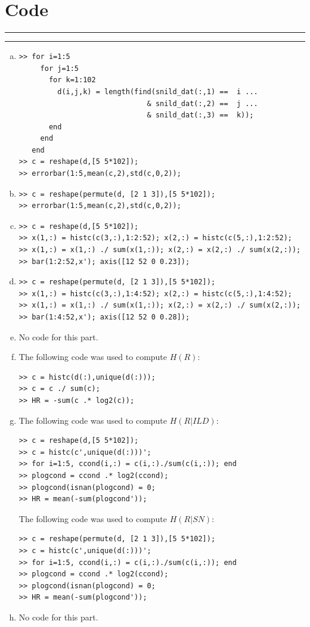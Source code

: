 \documentclass[11pt]{article}
\newcounter{questionCounter}
\newcounter{partCounter}[questionCounter]
\newenvironment{question}[2][\arabic{questionCounter}]{%
    \setcounter{partCounter}{0}%
    \vspace{.25in} \hrule \vspace{0.5em}%
        \noindent{\bf #2}%
    \vspace{0.8em} \hrule \vspace{.10in}%
    \addtocounter{questionCounter}{1}%
}{}
\begin{document}
\newpage
\section*{Code}

\begin{question}{Problem 1}
\begin{enumerate}[a.]
\item
\begin{verbatim}
>> for i=1:5
     for j=1:5
       for k=1:102
         d(i,j,k) = length(find(snild_dat(:,1) ==  i ...
                              & snild_dat(:,2) ==  j ...
                              & snild_dat(:,3) ==  k));
       end
     end
   end
>> c = reshape(d,[5 5*102]);
>> errorbar(1:5,mean(c,2),std(c,0,2));
\end{verbatim}

\item
\begin{verbatim}
>> c = reshape(permute(d, [2 1 3]),[5 5*102]);
>> errorbar(1:5,mean(c,2),std(c,0,2));
\end{verbatim}

\item
\begin{verbatim}
>> c = reshape(d,[5 5*102]);
>> x(1,:) = histc(c(3,:),1:2:52); x(2,:) = histc(c(5,:),1:2:52);
>> x(1,:) = x(1,:) ./ sum(x(1,:)); x(2,:) = x(2,:) ./ sum(x(2,:));
>> bar(1:2:52,x'); axis([12 52 0 0.23]);
\end{verbatim}

\item
\begin{verbatim}
>> c = reshape(permute(d, [2 1 3]),[5 5*102]);
>> x(1,:) = histc(c(3,:),1:4:52); x(2,:) = histc(c(5,:),1:4:52);
>> x(1,:) = x(1,:) ./ sum(x(1,:)); x(2,:) = x(2,:) ./ sum(x(2,:));
>> bar(1:4:52,x'); axis([12 52 0 0.28]);
\end{verbatim}

\item No code for this part.

\item The following code was used to compute $H(R)$:
\begin{verbatim}
>> c = histc(d(:),unique(d(:)));
>> c = c ./ sum(c);
>> HR = -sum(c .* log2(c));
\end{verbatim}

\item The following code was used to compute $H(R | ILD)$:
\begin{verbatim}
>> c = reshape(d,[5 5*102]);
>> c = histc(c',unique(d(:)))';
>> for i=1:5, ccond(i,:) = c(i,:)./sum(c(i,:)); end
>> plogcond = ccond .* log2(ccond);
>> plogcond(isnan(plogcond) = 0;
>> HR = mean(-sum(plogcond'));
\end{verbatim}
The following code was used to compute $H(R | SN)$:
\begin{verbatim}
>> c = reshape(permute(d, [2 1 3]),[5 5*102]);
>> c = histc(c',unique(d(:)))';
>> for i=1:5, ccond(i,:) = c(i,:)./sum(c(i,:)); end
>> plogcond = ccond .* log2(ccond);
>> plogcond(isnan(plogcond) = 0;
>> HR = mean(-sum(plogcond'));
\end{verbatim}
\item No code for this part.


\end{enumerate}
\end{question}
\end{document}
